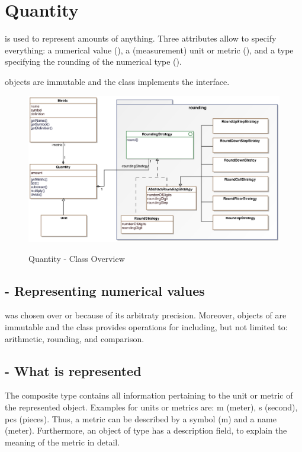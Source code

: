 \section{Quantity}
 is used to represent amounts of anything.
Three attributes allow  to specify everything: a numerical value (), a (measurement) unit or metric (), and a type specifying the rounding of the numerical type ().

 objects are immutable and the class implements the  interface.

\begin{figure}[ht]
	\centering
  \includegraphics[scale =.7]{images/Quantity_Overview.eps}
	\label{quantity_overview}
	\caption{Quantity - Class Overview}
\end{figure}

\subsection{ - Representing numerical values}
 was chosen over  or  because of its arbitraty precision.
Moreover, objects of  are immutable and the  class provides operations for including, but not limited to: arithmetic, rounding, and comparison.

\subsection{ - What is represented}
The composite type  contains all information pertaining to the unit or metric of the represented object.
Examples for units or metrics are: m (meter), s (second), pcs (pieces).
Thus, a metric can be described by a symbol (m) and a name (meter).
Furthermore, an object of type  has a description field, to explain the meaning of the metric in detail.

